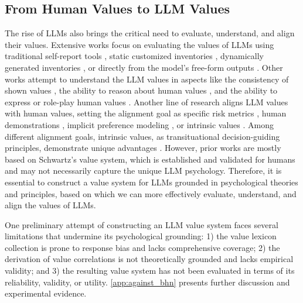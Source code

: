 \subsection{From Human Values to LLM Values}
\label{sec:human_to_llm_values}
The rise of LLMs also brings the critical need to evaluate, understand, and align their values. Extensive works focus on evaluating the values of LLMs using traditional self-report tools \cite{li2022gpt,li2024evaluatingpsychologicalsafetylarge, huang2024humanity, safdari2023-personality-traits-in-llm, safdari2023personality}, static customized inventories \cite{ren2024valuebench,meadows2024localvaluebench, jiang2024evaluating}, dynamically generated inventories \cite{jiang2024raising}, or directly from the model's free-form outputs \cite{ye2025gpv, yao2024clave,yao2023value_fulcra, yao2025leaderboard}.
Other works attempt to understand the LLM values in aspects like the consistency of shown values \cite{rozen2024llms, moore2024large,rottger2024political}, the ability to reason about human values \cite{ganesan2023systematic,sorensen2024value, jiang2024can, strachan2024testing}, and the ability to express or role-play human values \cite{jiang-etal-2024-personallm, zhang2023measuring, kang2024causal, zhang2025extrapolating, li2024quantifying, huang2024social}.
Another line of research aligns LLM values with human values, setting the alignment goal as specific risk metrics \cite{lin2024towards, gunjal2024detecting}, human demonstrations \cite{dubois2024alpacafarm, kopf2024openassistant, alpaca}, implicit preference modeling \cite{ouyang2022training, rafailov2024dpo, zhong2024panacea}, or intrinsic values \cite{bai2022hh, yao2023value_fulcra, bai2022constitutional}. Among different alignment goals, intrinsic values, as transituational decision-guiding principles, demonstrate unique advantages \cite{yao2023alignment_goals}. However, prior works are mostly based on Schwartz's value system, which is established and validated for humans and may not necessarily capture the unique LLM psychology. Therefore, it is essential to construct a value system for LLMs grounded in psychological theories and principles, based on which we can more effectively evaluate, understand, and align the values of LLMs.

One preliminary attempt \cite{biedma2024beyond} of constructing an LLM value system faces several limitations that undermine its psychological grounding: 1) the value lexicon collection is prone to response bias and lacks comprehensive coverage; 2) the derivation of value correlations is not theoretically grounded and lacks empirical validity; and 3) the resulting value system has not been evaluated in terms of its reliability, validity, or utility. \cref{app:against_bhn} presents further discussion and experimental evidence.
